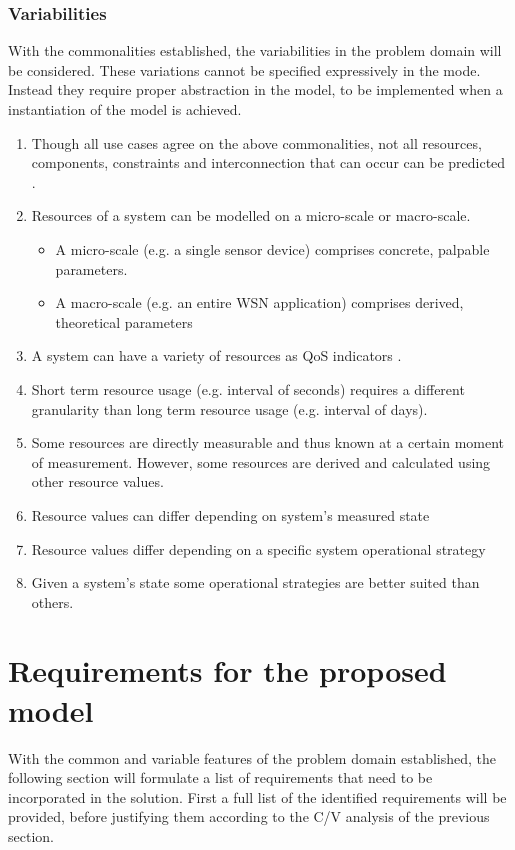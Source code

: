 \subsubsection{Variabilities}
With the commonalities established, the variabilities in the problem domain will be considered. These variations cannot be specified expressively in the mode. Instead they require proper abstraction in the model, to be implemented when a instantiation of the model is achieved.
\begin{enumerate}[label=V\rdmid .\arabic*]
\nospace
\item \label{v:1obvious} Though all use cases agree on the above commonalities, not all resources, components, constraints and interconnection that can occur can be predicted \cite{qos_challenges}.
\item \label{v:2micro_macro} Resources of a system can be modelled on a micro-scale or macro-scale.
\begin{itemize}
\nospace
\item A micro-scale (e.g. a single sensor device) comprises concrete, palpable parameters.
\item A macro-scale (e.g. an entire WSN application) comprises derived, theoretical parameters
\end{itemize}
\item \label{v:3nr_optimizer} A system can have a variety of resources as QoS indicators \cite{qos_challenges}.
\item \label{v:4granularity} Short term resource usage (e.g. interval of seconds) requires a different granularity than long term resource usage (e.g. interval of days).
\item \label{v:5measure_vs_derive} Some resources are directly measurable and thus known at a certain moment of measurement. However, some resources are derived and calculated using other resource values.
\item \label{v:6state} Resource values can differ depending on system's measured state
\item \label{v:7function} Resource values differ depending on a specific system operational strategy
\item \label{v:8rum} Given a system's state some operational strategies are better suited than others.
\end{enumerate}

\section{Requirements for the proposed model}
With the common and variable features of the problem domain established, the following section will formulate a list of requirements that need to be incorporated in the solution. First a full list of the identified requirements will be provided, before justifying them according to the C/V analysis of the previous section.
